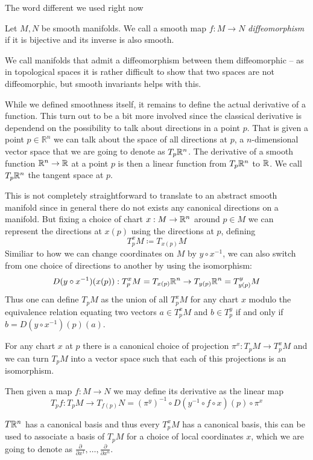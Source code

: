 The word different we used right now 
\begin{definition}
	Let $M,N$ be smooth manifolds. We call a smooth map $f: M \to N$ \textit{diffeomorphism} if it is bijective and
	its inverse is also smooth.
\end{definition}
We call manifolds that admit a diffeomorphism between them diffeomorphic – as in topological spaces it is rather difficult
to show that two spaces are not diffeomorphic, but smooth invariants helps with this.

While we defined smoothness itself, it remains to define the actual derivative of a 
function. This turn out to be a bit more involved since the classical derivative
is dependend on the possibility to talk about directions in a point $p$. That
is given a point $p \in \mathbb{R}^n$ we can talk about the space of all
directions at $p$, a $n$-dimensional vector space that we are going to denote as
$T_p \mathbb{R}^n$. The derivative of a smooth function $\mathbb{R}^n \to \mathbb{R}$ at a point $p$
is then a linear function from $T_p \mathbb{R}^n$ to $\mathbb{R}$. We call $T_p \mathbb{R}^n$ the 
tangent space at $p$.

This is not completely straightforward to translate to an abstract smooth manifold
since in general there do not exists any canonical directions on a manifold. But
fixing a choice of chart $x: M \to \mathbb{R}^n$ around $p \in M$  we can represent the
directions at $x(p)$ using the directions at $p$, defining 
\[
	T_p^x M \coloneqq T_{x(p)} M
\]
Similiar to how we can change coordinates on $M$ by $y \circ x^{-1}$, we can also
switch from one choice of directions to another by using the isomorphism:
\[
	D(y \circ x^{-1})(x(p)): T^x_p M = T_{x(p)} \mathbb{R}^n \to T_{y(p)} \mathbb{R}^n = T^y_{y(p)} M
\]
Thus one can define $T_p M$ as the union of all $T^x_p M$ for any chart $x$ modulo
the equivalence relation equating two vectors $a \in T^x_p M$ and $b \in T^y_p$
if and only if $b = D(y \circ x^{-1})(p)(a)$.

For any chart $x$ at $p$ there is a canonical choice of projection
$\pi^x: T_p M \to T_p^x M$ and we can turn $T_p M$ into a vector space such that each
of this projections is an isomorphism.

Then given a map $f: M \to N$ we may define its derivative as the linear map
\[
	T_pf: T_p M \to T_{f(p)}N = (\pi^y)^{-1} \circ D(y^{-1} \circ f \circ x)(p) \circ \pi^x
\]

$T \mathbb{R}^n$ has a canonical basis and thus every $T_p^x M$ has a canonical basis, this
can be used to associate a basis of $T_p M$ for a choice of local coordinates $x$,
which we are going to denote as
$\frac{\partial}{\partial x^1}, \dots, \frac{\partial}{\partial x^n}$.

